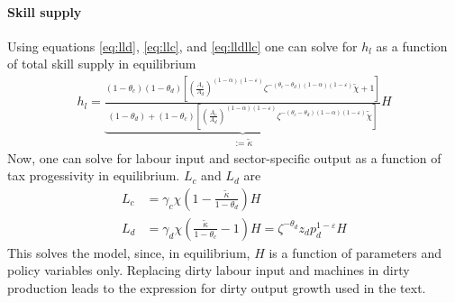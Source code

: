 \paragraph{Skill supply}
Using equations \ref{eq:lld}, \ref{eq:llc}, and \ref{eq:lldllc} one can solve for $h_l$ as a function of total skill supply in equilibrium
\begin{align}
	h_l= \underbrace{\frac{(1-\theta_c)(1-\theta_d)\left[\left(\frac{A_c}{A_d}\right)^{(1-\alpha)(1-\varepsilon)}\zeta^{-(\theta_c-\theta_d)(1-\alpha)(1-\varepsilon)}\tilde{\chi}+1\right]}{(1-\theta_d)+(1-\theta_c)\left[\left(\frac{A_c}{A_d}\right)^{(1-\alpha)(1-\varepsilon)}\zeta^{-(\theta_c-\theta_d)(1-\alpha)(1-\varepsilon)}\tilde{\chi}\right]}}_{:=\tilde{\kappa}}H
\end{align}
Now, one can solve for labour input and sector-specific output as a function of tax progessivity  in equilibrium. 
$L_c$ and $L_d$ are
\begin{align}
	L_c&= \gamma_c \chi \left(1-\frac{\tilde{\kappa}}{1-\theta_d}\right)H\\
	L_d&= \gamma_d \chi \left(\frac{\tilde{\kappa}}{1-\theta_c}-1\right)H=\zeta^{-\theta_d}z_dp_d^{1-\varepsilon}H
\end{align}
This solves the model, since, in equilibrium,  $H$ is a function of parameters and policy variables only. 
Replacing dirty labour input and machines in dirty production leads to the expression for dirty output growth used in the text. 

